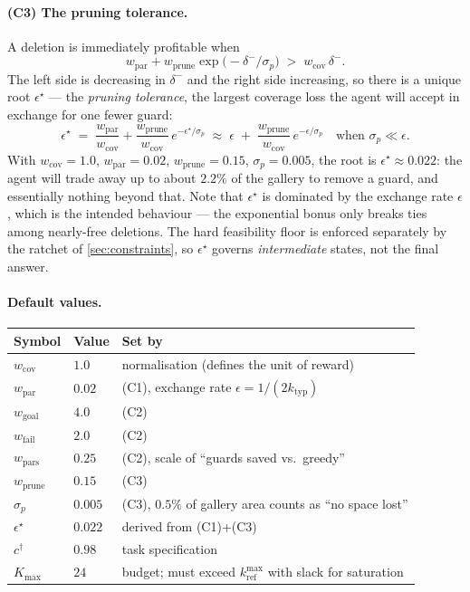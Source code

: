 \documentclass[11pt,a4paper]{article}
\begin{document}
\paragraph{(C3) The pruning tolerance.}
A deletion is immediately profitable when
\[
  w_{\mathrm{par}} + w_{\mathrm{prune}}\exp\!\bigl(-\delta^{-}/\sigma_p\bigr)
  \;>\; w_{\mathrm{cov}}\,\delta^{-}.
\]
The left side is decreasing in $\delta^-$ and the right side increasing, so there is a
unique root $\epsilon^{\star}$ --- the \emph{pruning tolerance}, the largest coverage loss
the agent will accept in exchange for one fewer guard:
\begin{equation}\label{eq:tolerance}
  \epsilon^{\star}
  \;=\; \frac{w_{\mathrm{par}}}{w_{\mathrm{cov}}}
      + \frac{w_{\mathrm{prune}}}{w_{\mathrm{cov}}}\,e^{-\epsilon^{\star}/\sigma_p}
  \;\approx\; \epsilon \;+\; \frac{w_{\mathrm{prune}}}{w_{\mathrm{cov}}}\,e^{-\epsilon/\sigma_p}
  \quad\text{when } \sigma_p \ll \epsilon .
\end{equation}
With $w_{\mathrm{cov}} = 1.0$, $w_{\mathrm{par}} = 0.02$, $w_{\mathrm{prune}} = 0.15$,
$\sigma_p = 0.005$, the root is $\epsilon^{\star} \approx 0.022$: the agent will trade away
up to about $2.2\%$ of the gallery to remove a guard, and essentially nothing beyond that.
Note that $\epsilon^\star$ is dominated by the exchange rate $\epsilon$, which is the
intended behaviour --- the exponential bonus only breaks ties among nearly-free deletions.
The hard feasibility floor is enforced separately by the ratchet of
\cref{sec:constraints}, so $\epsilon^\star$ governs \emph{intermediate} states, not the
final answer.

\paragraph{Default values.}
\begin{center}
\small
\begin{tabular}{@{}l l l@{}}
\toprule
\textbf{Symbol} & \textbf{Value} & \textbf{Set by} \\
\midrule
$w_{\mathrm{cov}}$    & $1.0$   & normalisation (defines the unit of reward) \\
$w_{\mathrm{par}}$    & $0.02$  & (C1), exchange rate $\epsilon = 1/(2k_{\mathrm{typ}})$ \\
$w_{\mathrm{goal}}$   & $4.0$   & (C2) \\
$w_{\mathrm{fail}}$   & $2.0$   & (C2) \\
$w_{\mathrm{pars}}$   & $0.25$  & (C2), scale of ``guards saved vs.\ greedy'' \\
$w_{\mathrm{prune}}$  & $0.15$  & (C3) \\
$\sigma_p$            & $0.005$ & (C3), $0.5\%$ of gallery area counts as ``no space lost'' \\
$\epsilon^{\star}$    & $0.022$ & derived from (C1)+(C3) \\
$c^{\dagger}$         & $0.98$  & task specification \\
$K_{\max}$            & $24$    & budget; must exceed $k_{\mathrm{ref}}^{\max}$ with slack for saturation \\
\bottomrule
\end{tabular}
\end{center}
\end{document}
